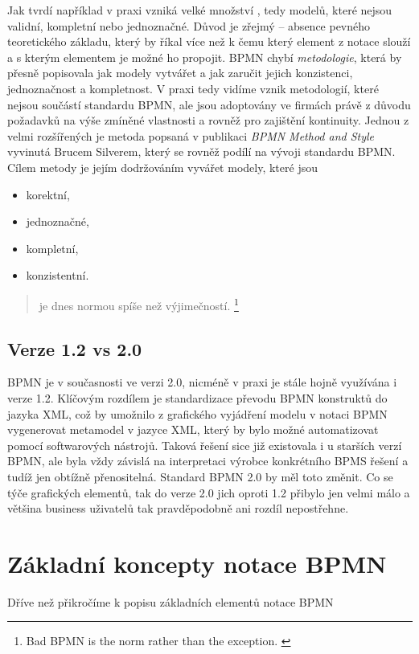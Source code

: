 \documentclass[]{article}
\begin{document}
Jak tvrdí například \cite{Silver2011} v praxi vzniká velké množství , tedy modelů, které nejsou validní, kompletní nebo jednoznačné. Důvod je zřejmý – absence pevného teoretického základu, který by říkal více než k čemu který element z notace slouží a s kterým elementem je možné ho propojit. BPMN chybí \textit{metodologie}, která by přesně popisovala jak modely vytvářet a jak zaručit jejich konzistenci, jednoznačnost a kompletnost. V praxi tedy vidíme vznik metodologií, které nejsou součástí standardu BPMN, ale jsou adoptovány ve firmách právě z důvodu požadavků na výše zmíněné vlastnosti a rovněž pro zajištění kontinuity. Jednou z velmi rozšířených je metoda popsaná v publikaci \textit{BPMN Method and Style} vyvinutá Brucem Silverem, který se rovněž podílí na vývoji standardu BPMN. Cílem metody je jejím dodržováním vyvářet modely, které jsou

\begin{itemize}
\item korektní,
\item jednoznačné,
\item kompletní,
\item konzistentní.
\end{itemize}

\begin{quote}
 je dnes normou spíše než výjimečností. \cite{Silver2011}
\footnote{Bad BPMN is the norm rather than the exception. \cite{Silver2011}}
\end{quote}

\subsection{Verze 1.2 vs 2.0}
BPMN je v současnosti ve verzi 2.0, nicméně v praxi je stále hojně využívána i verze 1.2. Klíčovým rozdílem je standardizace převodu BPMN konstruktů do jazyka XML, což by umožnilo z grafického vyjádření modelu v notaci BPMN vygenerovat metamodel v jazyce XML, který by bylo možné automatizovat pomocí softwarových nástrojů. Taková řešení sice již existovala i u starších verzí BPMN, ale byla vždy závislá na interpretaci výrobce konkrétního BPMS řešení a tudíž jen obtížně přenositelná. Standard BPMN 2.0 by měl toto změnit. Co se týče grafických elementů, tak do verze 2.0 jich oproti 1.2 přibylo jen velmi málo a většina business uživatelů tak pravděpodobně ani rozdíl nepostřehne.

\section{Základní koncepty notace BPMN}
Dříve než přikročíme k popisu základních elementů notace BPMN
\end{document}
